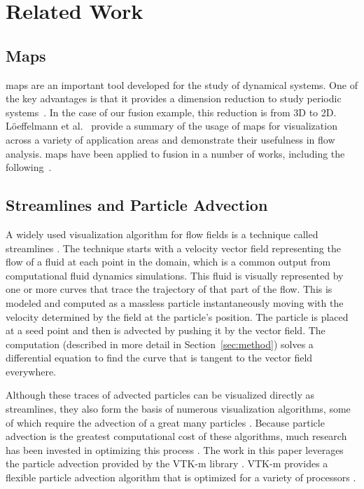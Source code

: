 \vspace{-.1in}
\section{Related Work}
\label{sec:related}

\subsection{\poincare Maps}
\poincare maps are an important tool developed for the study of dynamical systems. One of the key advantages is that it provides a dimension reduction to study periodic systems~\cite{morrison2000magnetic}. In the case of our fusion example, this reduction is from 3D to 2D.  L{\"o}effelmann et al.~\cite{Loeffelmann-1997-VPM} provide a summary of the usage of \poincare maps for visualization across a variety of application areas and demonstrate their usefulness in flow analysis.
\poincare maps have been applied to fusion in a number of works, including the following~\cite{Sanderson2010, Sanderson2012understanding, Tricoche2011 }.


\subsection{Streamlines and Particle Advection}

A widely used visualization algorithm for flow fields is a technique called streamlines \cite{VTKTextbook}.
The technique starts with a velocity vector field representing the flow of a fluid at each point in the domain, which is a common output from computational fluid dynamics simulations.
This fluid is visually represented by one or more curves that trace the trajectory of that part of the flow.
This is modeled and computed as a massless particle instantaneously moving with the velocity determined by the field at the particle's position.
The particle is placed at a seed point and then is advected by pushing it by the vector field.
The computation (described in more detail in Section~\ref{sec:method}) solves a differential equation to find the curve that is tangent to the vector field everywhere.

Although these traces of advected particles can be visualized directly as streamlines, they also form the basis of numerous visualization algorithms, some of which require the advection of a great many particles \cite{Hultquist1992,Guo2016}.
Because particle advection is the greatest computational cost of these algorithms, much research has been invested in optimizing this process \cite{Zhang2018, Yenpure2023}.
The work in this paper leverages the particle advection provided by the VTK-m library \cite{moreland2016vtk}.
VTK-m provides a flexible particle advection algorithm that is optimized for a variety of processors \cite{Pugmire2018}.

